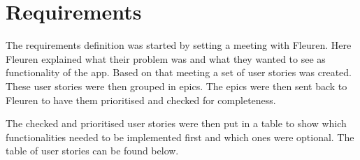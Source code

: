 \section{Requirements\label{sec:Requirements}}
The requirements definition was started by setting a meeting with Fleuren. Here Fleuren explained what their problem was and what they wanted to see as functionality of the app. Based on that meeting a set of user stories was created. These user stories were then grouped in epics. The epics were then sent back to Fleuren to have them prioritised and checked for completeness.

The checked and prioritised user stories were then put in a table to show which functionalities needed to be implemented first and which ones were optional. The table of user stories can be found below.

